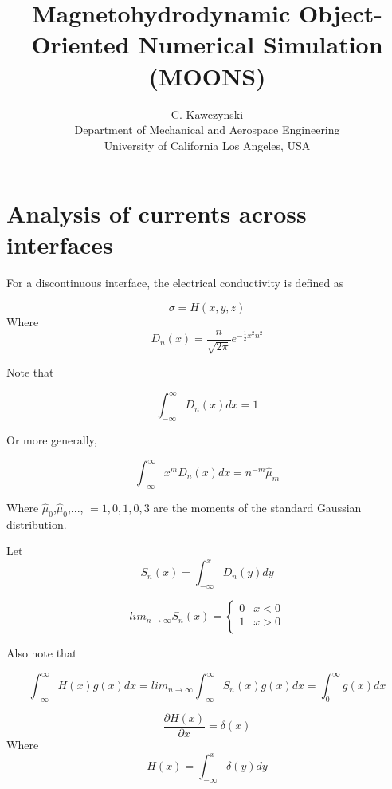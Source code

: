 \documentclass[11pt]{article}
\begin{document}
\doublespacing
\title{Magnetohydrodynamic Object-Oriented Numerical Simulation (MOONS)}
\author{C. Kawczynski \\
Department of Mechanical and Aerospace Engineering \\
University of California Los Angeles, USA\\
}
\maketitle

\section{Analysis of currents across interfaces}

For a discontinuous interface, the electrical conductivity is defined as

\begin{equation}
	\sigma = H(x,y,z)
\end{equation}
Where
\begin{equation}
	D_n(x) = \frac{n}{\sqrt{2\pi}} e^{- \frac{1}{2}x^2n^2}
\end{equation}

Note that

\begin{equation}
	\int_{-\infty}^{\infty} D_n(x) dx = 1
\end{equation}

Or more generally,

\begin{equation}
	\int_{-\infty}^{\infty} x^m D_n(x) dx = n^{-m} \hat{\mu}_m
\end{equation}

Where $\hat{\mu}_0$,$\hat{\mu}_0$,..., $=1,0,1,0,3$ are the moments of the standard Gaussian distribution.

Let
\begin{equation}
	S_n(x) = \int_{-\infty}^{x} D_n(y) dy
\end{equation}

\begin{equation}
	lim_{n\rightarrow \infty} S_n(x)
	=
	\begin{cases}
	0 & x<0 \\
	1 & x>0 \\
	\end{cases}
\end{equation}

Also note that

\begin{equation}
	\int_{-\infty}^{\infty} H(x) g(x) dx
	=
	lim_{n\rightarrow \infty}
	\int_{-\infty}^{\infty} S_n(x) g(x) dx
	=
	\int_0^{\infty} g(x) dx
\end{equation}

\begin{equation}
	\frac{\partial H(x)}{\partial x} = \delta (x)
\end{equation}
Where
\begin{equation}
	H(x) = \int_{-\infty}^{x} \delta (y) dy
\end{equation}
\end{document}

